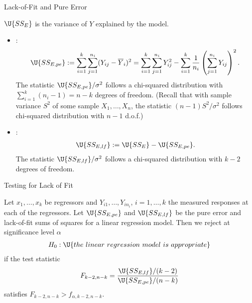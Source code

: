 \begin{frame}{Lack-of-Fit and Pure Error}

\justifying
{} $\U{SS_E}$ is the variance of $Y$ explained by the model.
\begin{itemize}
	\justifying
	\item {}:
	\footnotesize
	\begin{align*}
	\U{SS_{E,pe}} := \sum_{i=1}^k \sum_{j=1}^{n_i} (Y_{ij}-\overline{Y}_i)^2 = \sum_{i=1}^k\sum_{j=1}^{n_i} Y_{ij}^2 - \sum_{i=1}^k \frac{1}{n_i}\left(\sum_{j=1}^{n_i} Y_{ij} \right)^2.
	\end{align*}
	\normalsize
	The statistic $\U{SS_{E,pe}}/\sigma^2$ follows a chi-squared distribution with $\sum_{i=1}^k (n_i - 1) = n-k$ degrees of freedom. (Recall that with sample variance $S^2$ of some sample $X_1, \ldots, X_n$, the statistic $(n-1)S^2/\sigma^2$ follows chi-squared distribution with $n-1$ d.o.f.)
	\item {}:
	\footnotesize
	\begin{align*}
	\U{SS_{E,lf}} := \U{SS_E} - \U{SS_{E,pe}}.
	\end{align*}
	\normalsize
	The statistic $\U{SS_{E,lf}}/\sigma^2$ follows a chi-squared distribution with $k-2$ degrees of freedom.
\end{itemize}


\end{frame}


\begin{frame}{Testing for Lack of Fit}

\justifying
{} Let $x_1, \ldots, x_k$ be regressors and $Y_{i1}, \ldots, Y_{in_i}$, $i = 1, \ldots, k$ the measured responses at each of the regressors. Let $\U{SS_{E,pe}}$ and $\U{SS_{E,lf}}$ be the pure error and lack-of-fit sums of squares for a linear regression model. Then we reject at significance level $\alpha$
\begin{align*}
H_0: \U{the\ linear\ regression\ model\ is\ appropriate}
\end{align*}
if the test statistic
\begin{align*}
F_{k-2,n-k} = \frac{\U{SS_{E,lf}}/(k-2)}{\U{SS_{E,pe}}/(n-k)}
\end{align*}
satisfies $F_{k-2,n-k} > f_{\alpha,k-2,n-k}$.

\end{frame}



